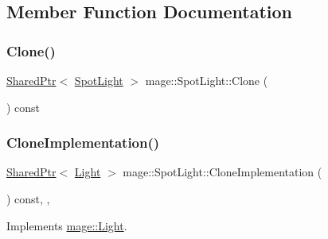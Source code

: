 \subsection{Member Function Documentation}
\hypertarget{classmage_1_1_spot_light_aa2c787093d1fc29d79c11ecab40f33fd}{}\label{classmage_1_1_spot_light_aa2c787093d1fc29d79c11ecab40f33fd} 
\subsubsection{\texorpdfstring{Clone()}{Clone()}}
{\footnotesize\ttfamily \hyperlink{namespacemage_a1e01ae66713838a7a67d30e44c67703e}{Shared\+Ptr}$<$ \hyperlink{classmage_1_1_spot_light}{Spot\+Light} $>$ mage\+::\+Spot\+Light\+::\+Clone (\begin{DoxyParamCaption}{ }\end{DoxyParamCaption}) const}

\hypertarget{classmage_1_1_spot_light_a28af107205b30f115b5b722ea45bf366}{}\label{classmage_1_1_spot_light_a28af107205b30f115b5b722ea45bf366} 
\subsubsection{\texorpdfstring{Clone\+Implementation()}{CloneImplementation()}}
{\footnotesize\ttfamily \hyperlink{namespacemage_a1e01ae66713838a7a67d30e44c67703e}{Shared\+Ptr}$<$ \hyperlink{classmage_1_1_light}{Light} $>$ mage\+::\+Spot\+Light\+::\+Clone\+Implementation (\begin{DoxyParamCaption}{ }\end{DoxyParamCaption}) const\hspace{0.3cm}{\ttfamily [override]}, {\ttfamily [private]}, {\ttfamily [virtual]}}



Implements \hyperlink{classmage_1_1_light_a53ef28bad86a1a307db90cb265db4798}{mage\+::\+Light}.

\hypertarget{classmage_1_1_spot_light_ac04202c48cb4c12334f9f55757a3d73a}{}\label{classmage_1_1_spot_light_ac04202c48cb4c12334f9f55757a3d73a} 
